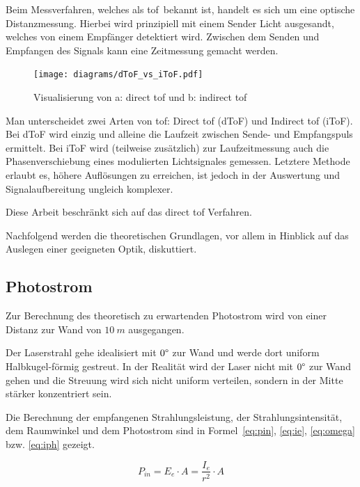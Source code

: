 Beim Messverfahren, welches als \dq \acrlong{tof}\dq\ bekannt ist, handelt es sich um eine optische Distanzmessung.
Hierbei wird prinzipiell mit einem Sender Licht ausgesandt, welches von einem Empfänger detektiert wird. Zwischen dem
Senden und Empfangen des Signals kann eine Zeitmessung gemacht werden.

\begin{figure}[H]
    \centering
    \texttt{[image: diagrams/dToF\_vs\_iToF.pdf]}
    \caption{Visualisierung von a: direct \acrshort{tof} und b: indirect \acrshort{tof}}\label{fig:dtof_vs_itof}
\end{figure}

Man unterscheidet zwei Arten von \acrshort{tof}: Direct \acrshort{tof} (dToF) und Indirect \acrshort{tof} (iToF). Bei dToF
wird einzig und alleine die Laufzeit zwischen Sende- und Empfangspuls ermittelt. Bei iToF wird (teilweise zusätzlich) zur
Laufzeitmessung auch die Phasenverschiebung eines modulierten Lichtsignales gemessen. Letztere Methode erlaubt es, höhere
Auflösungen zu erreichen, ist jedoch in der Auswertung und Signalaufbereitung ungleich komplexer.

Diese Arbeit beschränkt sich auf das direct \acrshort{tof} Verfahren.

Nachfolgend werden die theoretischen Grundlagen, vor allem in Hinblick auf das Auslegen einer geeigneten Optik, diskuttiert.

\pagebreak

\subsection{Photostrom}

Zur Berechnung des theoretisch zu erwartenden Photostrom wird von einer Distanz zur Wand von $10~m$ ausgegangen.

Der Laserstrahl gehe idealisiert mit $0\degree$ zur Wand und werde dort uniform Halbkugel-förmig gestreut. In der
Realität wird der Laser nicht mit $0\degree$ zur Wand gehen und die Streuung wird sich nicht uniform verteilen, sondern
in der Mitte stärker konzentriert sein.

Die Berechnung der empfangenen Strahlungsleistung, der Strahlungsintensität, dem Raumwinkel und dem Photostrom sind in
Formel~\ref{eq:pin}, \ref{eq:ie}, \ref{eq:omega} bzw. \ref{eq:iph} gezeigt.

\begin{equation}\label{eq:pin}
    P_{in} = E_e \cdot A = \frac{I_e}{r^2} \cdot A
\end{equation}

